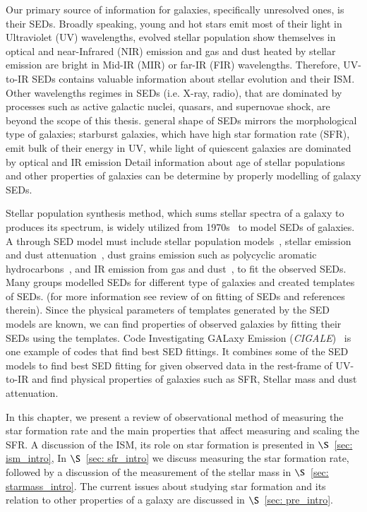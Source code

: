 Our primary source of information for galaxies, specifically unresolved ones, is their SEDs.
Broadly speaking, young and hot stars emit most of their light in Ultraviolet (UV) wavelengths, evolved stellar population show themselves in optical and near-Infrared (NIR) emission and gas and dust heated by stellar emission are bright in Mid-IR (MIR) or far-IR (FIR) wavelengths.
Therefore, UV-to-IR SEDs contains valuable information about stellar evolution and their ISM. 
Other wavelengths regimes in SEDs (i.e. X-ray, radio), that are dominated by processes such as active galactic nuclei, quasars, and supernovae shock, are beyond the scope of this thesis.
general shape of SEDs mirrors the morphological type of galaxies; starburst galaxies, which have high star formation rate (SFR), emit bulk of their energy in UV, while light of quiescent galaxies are dominated by optical and IR emission 
Detail information about age of stellar populations and other properties of galaxies can be determine by properly modelling of galaxy SEDs.

Stellar population synthesis method, which sums stellar spectra of a galaxy to produces its spectrum, is widely utilized from 1970s~\citep[e.g.][]{Tinsley72,Searle73} to model SEDs of galaxies.
A through SED model must include stellar population models~\citep[e.g.][]{Bruzual93,Bruzual03,Maraston05}, stellar emission and dust attenuation~\citep[e.g.][]{Calzetti00,Dopita05}, dust grains emission such as polycyclic aromatic hydrocarbons~\citep[PAHs; e.g.][and references therein]{Tielens08}, and IR emission from gas and dust~\citep[e.g.][]{Chary01,Dale02,Lagache03,Lagache04,Smith07a,Draine07}, to fit the observed SEDs.
Many groups modelled SEDs for different type of galaxies and created templates of SEDs. (for more information see review of \cite{Walcher11} on fitting of SEDs and references therein).
Since the physical parameters of templates generated by the SED models are known, we can find properties of observed galaxies by fitting their SEDs using the templates.
Code Investigating GALaxy Emission ({\em CIGALE})~\citep{Noll09} is one example of codes that find best SED fittings.
It combines some of the SED models to find best SED fitting for given observed data in the rest-frame of UV-to-IR and find physical properties of galaxies such as SFR, Stellar mass and dust attenuation.

In this chapter, we present a review of observational method of measuring the star formation rate and the main properties that affect measuring and scaling the SFR. A discussion of the ISM, its role on star formation is presented in $\S$~\ref{sec: ism_intro}, In $\S$~\ref{sec: sfr_intro} we discuss measuring the star formation rate, followed by a discussion of the measurement of the stellar mass in $\S$~\ref{sec: starmass_intro}. The current issues about studying star formation and its relation to other properties of a galaxy are discussed in $\S$~\ref{sec: pre_intro}. 



